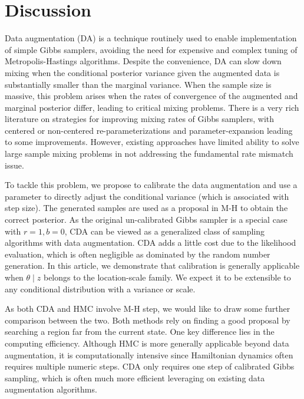\documentclass[12pt]{article}
\begin{document}
\section{Discussion}
Data augmentation (DA) is a technique routinely used to enable implementation of simple Gibbs samplers, avoiding the need for expensive and complex tuning of Metropolis-Hastings algorithms.
Despite the convenience, DA can slow down mixing when the conditional posterior variance given the augmented data is substantially smaller than the marginal variance.  When the sample size is massive, this problem arises when the rates of convergence of the augmented and marginal posterior differ, leading to 
critical mixing problems.  There is a very rich literature on strategies for improving mixing rates of Gibbs samplers, with centered or non-centered re-parameterizations \citep{papaspiliopoulos2007general} and parameter-expansion \citep{liu1999parameter} leading to some improvements.  However, existing approaches have limited ability to solve large sample mixing problems in not addressing the fundamental rate
mismatch issue.

To tackle this problem, we propose to calibrate the data augmentation and use a parameter to directly adjust the conditional variance (which is associated with step size). The generated samples are used as a proposal in  M-H to obtain the correct posterior. As the original un-calibrated Gibbs sampler is a special case with $r=1, b=0$, CDA can be viewed as a generalized class of sampling algorithms with data augmentation. CDA adds a little cost due to the likelihood evaluation, which is often negligible as dominated by the random number generation. In this article, we demonstrate that calibration is generally applicable when $\theta \mid z$ belongs to the location-scale family. We expect it to be extensible to any conditional distribution with a variance or scale.

As both CDA and HMC involve M-H step, we would like to draw some further comparison between the two. Both methods rely on finding a good proposal by searching a region far from the current state. One key difference lies in the computing efficiency. Although HMC is more generally applicable beyond data augmentation, it is computationally intensive since Hamiltonian dynamics often requires multiple numeric steps. CDA only requires one step of calibrated Gibbs sampling, which is often much more efficient leveraging on existing data augmentation algorithms.


\end{document}

